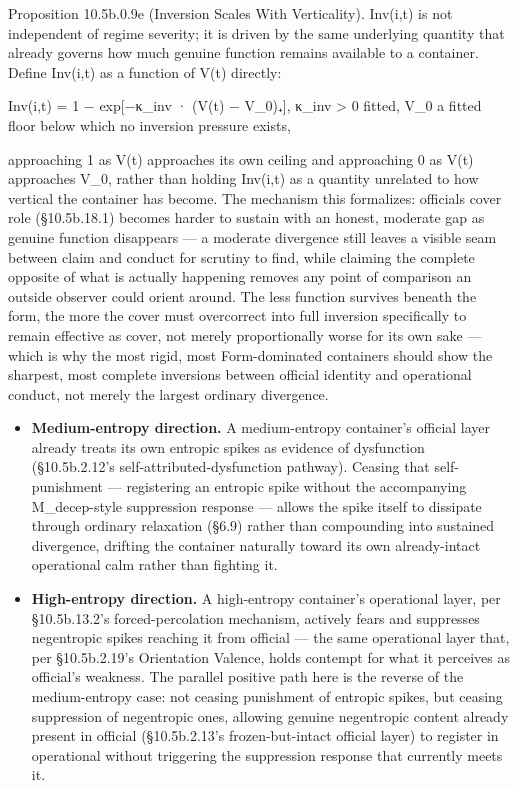 \documentclass[
]{article}
\begin{document}
Proposition 10.5b.0.9e (Inversion Scales With Verticality). Inv(i,t) is
not independent of regime severity; it is driven by the same underlying
quantity that already governs how much genuine function remains
available to a container. Define Inv(i,t) as a function of V(t)
directly:

Inv(i,t) = 1 − exp{[}−κ\_inv · (V(t) − V\_0)₊{]}, κ\_inv \textgreater{}
0 fitted, V\_0 a fitted floor below which no inversion pressure exists,

approaching 1 as V(t) approaches its own ceiling and approaching 0 as
V(t) approaches V\_0, rather than holding Inv(i,t) as a quantity
unrelated to how vertical the container has become. The mechanism this
formalizes: officials cover role (§10.5b.18.1) becomes harder to sustain
with an honest, moderate gap as genuine function disappears --- a
moderate divergence still leaves a visible seam between claim and
conduct for scrutiny to find, while claiming the complete opposite of
what is actually happening removes any point of comparison an outside
observer could orient around. The less function survives beneath the
form, the more the cover must overcorrect into full inversion
specifically to remain effective as cover, not merely proportionally
worse for its own sake --- which is why the most rigid, most
Form-dominated containers should show the sharpest, most complete
inversions between official identity and operational conduct, not merely
the largest ordinary divergence.

\begin{itemize}
\item
  \textbf{Medium-entropy direction.} A medium-entropy container's
  official layer already treats its own entropic spikes as evidence of
  dysfunction (§10.5b.2.12's self-attributed-dysfunction pathway).
  Ceasing that self-punishment --- registering an entropic spike without
  the accompanying M\_decep-style suppression response --- allows the
  spike itself to dissipate through ordinary relaxation (§6.9) rather
  than compounding into sustained divergence, drifting the container
  naturally toward its own already-intact operational calm rather than
  fighting it.
\item
  \textbf{High-entropy direction.} A high-entropy container's
  operational layer, per §10.5b.13.2's forced-percolation mechanism,
  actively fears and suppresses negentropic spikes reaching it from
  official --- the same operational layer that, per §10.5b.2.19's
  Orientation Valence, holds contempt for what it perceives as
  official's weakness. The parallel positive path here is the reverse of
  the medium-entropy case: not ceasing punishment of entropic spikes,
  but ceasing suppression of negentropic ones, allowing genuine
  negentropic content already present in official (§10.5b.2.13's
  frozen-but-intact official layer) to register in operational without
  triggering the suppression response that currently meets it.
\end{itemize}
\end{document}
